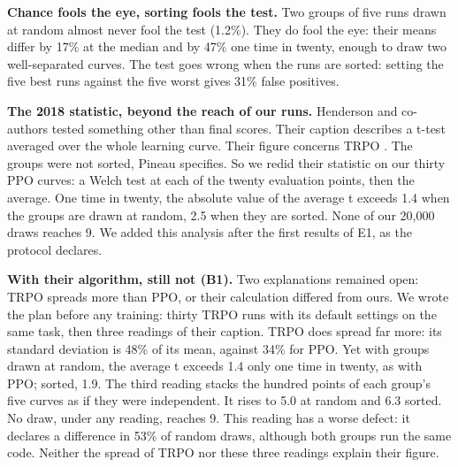 \documentclass[11pt,a4paper]{article}
\begin{document}
\textbf{Chance fools the eye, sorting fools the test.} Two groups of
five runs drawn at random almost never fool the test (1.2\%). They do
fool the eye: their means differ by 17\% at the median and by 47\% one
time in twenty, enough to draw two well-separated curves. The test goes
wrong when the runs are sorted: setting the five best runs against the
five worst gives 31\% false positives.

\textbf{The 2018 statistic, beyond the reach of our runs.} Henderson and
co-authors tested something other than final scores. Their caption
describes a t-test averaged over the whole learning curve. Their figure
concerns TRPO \autocite{henderson2018matters}. The groups were not
sorted, Pineau specifies. So we redid their statistic on our thirty PPO
curves: a Welch test at each of the twenty evaluation points, then the
average. One time in twenty, the absolute value of the average t exceeds
1.4 when the groups are drawn at random, 2.5 when they are sorted. None
of our 20,000 draws reaches 9. We added this analysis after the first
results of E1, as the protocol declares.

\textbf{With their algorithm, still not (B1).} Two explanations remained
open: TRPO spreads more than PPO, or their calculation differed from
ours. We wrote the plan before any training: thirty TRPO runs with its
default settings on the same task, then three readings of their caption.
TRPO does spread far more: its standard deviation is 48\% of its mean,
against 34\% for PPO. Yet with groups drawn at random, the average t
exceeds 1.4 only one time in twenty, as with PPO; sorted, 1.9. The third
reading stacks the hundred points of each group's five curves as if they
were independent. It rises to 5.0 at random and 6.3 sorted. No draw,
under any reading, reaches 9. This reading has a worse defect: it
declares a difference in 53\% of random draws, although both groups run
the same code. Neither the spread of TRPO nor these three readings
explain their figure.
\end{document}
